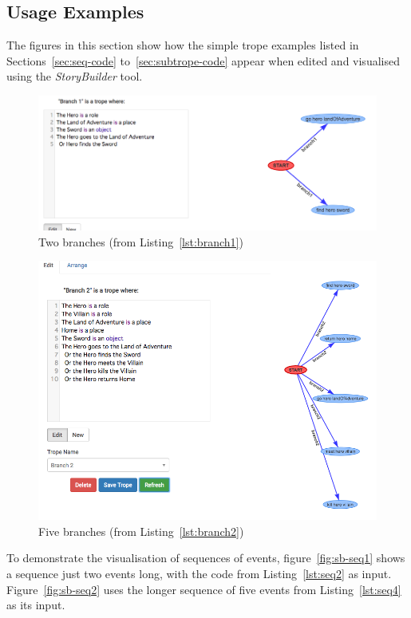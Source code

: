 \documentclass[11pt]{report}
\begin{document}
\subsection{Usage Examples}

The figures in this section show how the simple trope examples listed in Sections~\ref{sec:seq-code}
to~\ref{sec:subtrope-code} appear when edited and visualised using the
\emph{StoryBuilder} tool.

\begin{figure}[!t]
\centerline{\includegraphics[width=\textwidth]{storybuilder-branch1.png}}
\caption{Two branches (from Listing~\ref{lst:branch1})}\label{fig:sb-branch1}
\end{figure}

\begin{figure}[!t]
\centerline{\includegraphics[width=\textwidth]{storybuilder-branch2.png}}
\caption{Five branches (from Listing~\ref{lst:branch2})}\label{fig:sb-branch2}
\end{figure}

To demonstrate the visualisation of sequences of events,
figure~\ref{fig:sb-seq1} shows a sequence just two events long, with the code
from Listing~\ref{lst:seq2} as input. Figure~\ref{fig:sb-seq2} uses the longer
sequence of five events from Listing~\ref{lst:seq4} as its input.
\end{document}
